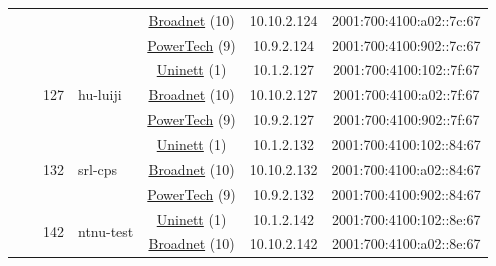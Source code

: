 \begin{small}
\begin{center}
\begin{longtable}{|c|c|c|c|c|c|c|c|}
  &  &  &  & \multicolumn{2}{|c|}{\tiny{\href{https://www.broadnet.no}{Broadnet} (10)}} & \tiny{10.10.2.124} & \tiny{2001:700:4100:a02::7c:67} \\* \cline{5-5}\cline{6-6}\cline{7-7}\cline{8-8}
  &  &  &  & \multicolumn{2}{|c|}{\tiny{\href{http://www.powertech.no}{PowerTech} (9)}} & \tiny{10.9.2.124} & \tiny{2001:700:4100:902::7c:67} \\* \cline{3-3}\cline{4-4}\cline{5-5}\cline{6-6}\cline{7-7}\cline{8-8}
  &  & \multirow{3}{*}{\tiny{127}} & \multicolumn{1}{|l|}{\multirow{3}{*}{\tiny{hu-luiji}}} & \multicolumn{2}{|c|}{\tiny{\href{https://www.uninett.no}{Uninett} (1)}} & \tiny{10.1.2.127} & \tiny{2001:700:4100:102::7f:67} \\* \cline{5-5}\cline{6-6}\cline{7-7}\cline{8-8}
  &  &  &  & \multicolumn{2}{|c|}{\tiny{\href{https://www.broadnet.no}{Broadnet} (10)}} & \tiny{10.10.2.127} & \tiny{2001:700:4100:a02::7f:67} \\* \cline{5-5}\cline{6-6}\cline{7-7}\cline{8-8}
  &  &  &  & \multicolumn{2}{|c|}{\tiny{\href{http://www.powertech.no}{PowerTech} (9)}} & \tiny{10.9.2.127} & \tiny{2001:700:4100:902::7f:67} \\* \cline{3-3}\cline{4-4}\cline{5-5}\cline{6-6}\cline{7-7}\cline{8-8}
  &  & \multirow{3}{*}{\tiny{132}} & \multicolumn{1}{|l|}{\multirow{3}{*}{\tiny{srl-cps}}} & \multicolumn{2}{|c|}{\tiny{\href{https://www.uninett.no}{Uninett} (1)}} & \tiny{10.1.2.132} & \tiny{2001:700:4100:102::84:67} \\* \cline{5-5}\cline{6-6}\cline{7-7}\cline{8-8}
  &  &  &  & \multicolumn{2}{|c|}{\tiny{\href{https://www.broadnet.no}{Broadnet} (10)}} & \tiny{10.10.2.132} & \tiny{2001:700:4100:a02::84:67} \\* \cline{5-5}\cline{6-6}\cline{7-7}\cline{8-8}
  &  &  &  & \multicolumn{2}{|c|}{\tiny{\href{http://www.powertech.no}{PowerTech} (9)}} & \tiny{10.9.2.132} & \tiny{2001:700:4100:902::84:67} \\* \cline{3-3}\cline{4-4}\cline{5-5}\cline{6-6}\cline{7-7}\cline{8-8}
  &  & \multirow{3}{*}{\tiny{142}} & \multicolumn{1}{|l|}{\multirow{3}{*}{\tiny{ntnu-test}}} & \multicolumn{2}{|c|}{\tiny{\href{https://www.uninett.no}{Uninett} (1)}} & \tiny{10.1.2.142} & \tiny{2001:700:4100:102::8e:67} \\* \cline{5-5}\cline{6-6}\cline{7-7}\cline{8-8}
  &  &  &  & \multicolumn{2}{|c|}{\tiny{\href{https://www.broadnet.no}{Broadnet} (10)}} & \tiny{10.10.2.142} & \tiny{2001:700:4100:a02::8e:67} \\* \cline{5-5}\cline{6-6}\cline{7-7}\cline{8-8}

\end{longtable}
\end{center}
\end{small}
